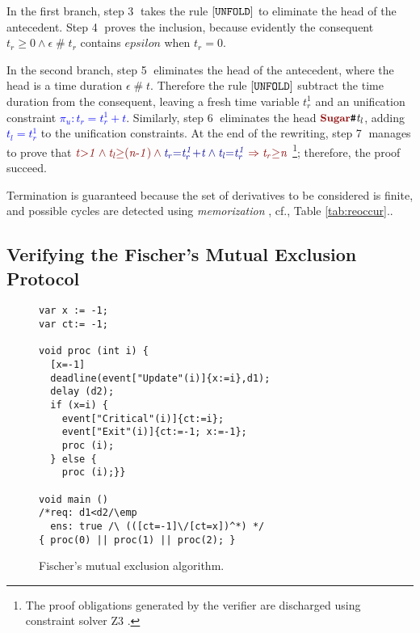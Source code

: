 \documentclass[acmsmall,10pt,review]{acmart}
\newcommand{\anyevent}[1]{{\textcolor{darkred}
{{\textbf{\small #1}}}}}
\newcommand{\code}[1]{{\tt{\ensuremath{\m{#1}}}}}
\newcommand{\codeme}[1]{{\tt{\ensuremath{#1}}}}
\newcommand{\m}{\mathit}
\newcommand{\mysharp}{{\mathrel{\texttt{\#}}}}
\newcommand\tabref[1]{Table \textcolor{black}{\ref{#1}}.}
\begin{document}
{In the first branch, step \textcircled{3} takes the rule 
$\codeme{[UNFOLD]}$ to eliminate the head of the antecedent. 
Step \textcircled{4} proves the inclusion, because 
evidently the consequent \code{t_r {\geq} 0 \wedge \epsilon \mysharp t_r} 
contains \code{epsilon} when \code{t_r{=}0}. 

In the second branch, step \textcircled{5} eliminates the 
head of the antecedent, where the head is a time duration \code{\epsilon\mysharp t}. 
Therefore the rule $\codeme{[UNFOLD]}$ subtract the time duration 
from the consequent, leaving a fresh time variable \code{t_r^1} and 
an unification constraint \textcolor{blue}{\code{\pi_u : t_r{=}t_r^1 {+}t}}. 
Similarly, step \textcircled{6} eliminates the head 
\code{\anyevent{Sugar}\mysharp t_l}, adding \textcolor{blue}{\code{t_l{=}t_r^1}} 
to the unification constraints. 
At the end of the rewriting, step \textcircled{7} manages to prove that 
\code{\textcolor {darkred}{  t{>}1 \wedge t_l{\geq}(n\text{-}1) 
\wedge  \textcolor{blue}{t_r{=}t_r^1 {+}t \wedge  t_l{=}t_r^1}  \Rightarrow t_r{\geq}n
}  } \footnote{The proof obligations generated by the verifier are discharged using constraint solver Z3 \cite{DBLP:conf/tacas/MouraB08}.}; therefore, the proof succeed.

Termination is guaranteed because the set of derivatives to be considered is finite, and possible cycles are detected using 
\emph{memorization} \cite{DBLP:conf/tableaux/Brotherston05}, cf., \tabref{tab:reoccur}. 


\subsection{Verifying the Fischer’s Mutual Exclusion Protocol}




\begin{wrapfigure}{L}{0.51\columnwidth}
  \vspace{-5mm}
\begin{lstlisting}
var x := -1; 
var ct:= -1;

void proc (int i) {
  [x=-1] 
  deadline(event["Update"(i)]{x:=i},d1);
  delay (d2);
  if (x=i) {
    event["Critical"(i)]{ct:=i};
    event["Exit"(i)]{ct:=-1; x:=-1};
    proc (i);
  } else {
    proc (i);}}

void main () 
/*req: d1<d2/\emp
  ens: true /\ (([ct=-1]\/[ct=x])^*) */ 
{ proc(0) || proc(1) || proc(2); }
\end{lstlisting}  
  \caption{Fischer's mutual exclusion algorithm.}\label{fig:overview_ficher}
\end{wrapfigure}

}
\end{document}
